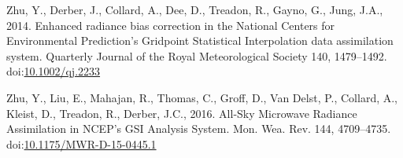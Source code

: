 \documentclass[final,5p,times,twocolumn,authoryear]{elsarticle} %
\begin{document}
\leavevmode\hypertarget{ref-zhu2014}{}%
Zhu, Y., Derber, J., Collard, A., Dee, D., Treadon, R., Gayno, G., Jung, J.A., 2014. Enhanced radiance bias correction in the National Centers for Environmental Prediction's Gridpoint Statistical Interpolation data assimilation system. Quarterly Journal of the Royal Meteorological Society 140, 1479--1492. doi:\href{https://doi.org/10.1002/qj.2233}{10.1002/qj.2233}

\leavevmode\hypertarget{ref-zhu2016}{}%
Zhu, Y., Liu, E., Mahajan, R., Thomas, C., Groff, D., Van Delst, P., Collard, A., Kleist, D., Treadon, R., Derber, J.C., 2016. All-Sky Microwave Radiance Assimilation in NCEP's GSI Analysis System. Mon. Wea. Rev. 144, 4709--4735. doi:\href{https://doi.org/10.1175/MWR-D-15-0445.1}{10.1175/MWR-D-15-0445.1}
\end{document}
